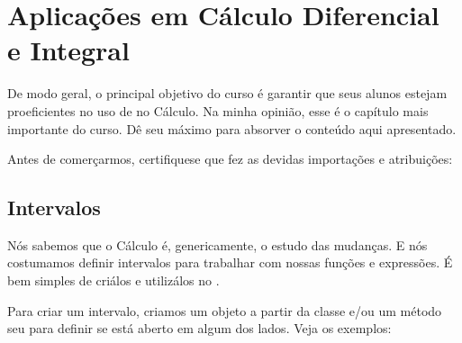 \documentclass[letterpaper,10pt,english]{jupyterBook}
\begin{document}
\chapter{Aplicações em Cálculo Diferencial e Integral}
\label{\detokenize{chapters/4:aplicacoes-em-calculo-diferencial-e-integral}}\label{\detokenize{chapters/4::doc}}
\sphinxAtStartPar
De modo geral, o principal objetivo do curso é garantir que seus alunos estejam proeficientes no uso de  no Cálculo. Na minha opinião, esse é o capítulo mais importante do curso. Dê seu máximo para absorver o conteúdo aqui apresentado.

\sphinxAtStartPar
Antes de comerçarmos, certifique\sphinxhyphen{}se que fez as devidas importações e atribuições:

\begin{sphinxVerbatim}[commandchars=\\\{\}]
   
    
 
\end{sphinxVerbatim}


\section{Intervalos}
\label{\detokenize{chapters/4:intervalos}}
\sphinxAtStartPar
Nós sabemos que o Cálculo é, genericamente, o estudo das mudanças. E nós costumamos definir intervalos para trabalhar com nossas funções e expressões. É bem simples de criá\sphinxhyphen{}los e utilizá\sphinxhyphen{}los no .

\sphinxAtStartPar
Para criar um intervalo, criamos um objeto a partir da classe  e/ou um método seu para definir se está aberto em algum dos lados. Veja os exemplos:
\end{document}

